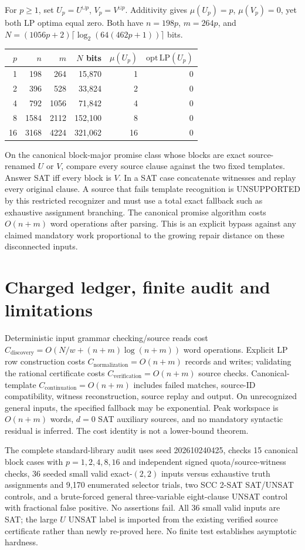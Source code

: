 \documentclass[11pt]{article}
\begin{document}
For $p\ge1$, set $U_p=U^{\sqcup p}$, $V_p=V^{\sqcup p}$. Additivity gives $\mu(U_p)=p$, $\mu(V_p)=0$, yet both LP optima equal zero. Both have $n=198p$, $m=264p$, and $N=(1056p+2)\lceil\log_2(64(462p+1))\rceil$ bits.
\begin{center}\begin{tabular}{rrrrrr}\toprule
$p$&$n$&$m$&$N$ bits&$\mu(U_p)$&$\mathrm{opt\,LP}(U_p)$\\\midrule
1&198&264&15,870&1&0\\
2&396&528&33,824&2&0\\
4&792&1056&71,842&4&0\\
8&1584&2112&152,100&8&0\\
16&3168&4224&321,062&16&0\\\bottomrule\end{tabular}\end{center}
On the canonical block-major promise class whose blocks are exact source-renamed $U$ or $V$, compare every source clause against the two fixed templates. Answer SAT iff every block is $V$. In a SAT case concatenate witnesses and replay every original clause. A source that fails template recognition is UNSUPPORTED by this restricted recognizer and must use a total exact fallback such as exhaustive assignment branching. The canonical promise algorithm costs $O(n+m)$ word operations after parsing. This is an explicit bypass against any claimed mandatory work proportional to the growing repair distance on these disconnected inputs.

\section{Charged ledger, finite audit and limitations}
Deterministic input grammar checking/source reads cost $C_{\mathrm{discovery}}=O(N/w+(n+m)\log(n+m))$ word operations. Explicit LP row construction costs $C_{\mathrm{normalization}}=O(n+m)$ records and writes; validating the rational certificate costs $C_{\mathrm{verification}}=O(n+m)$ source checks. Canonical-template $C_{\mathrm{continuation}}=O(n+m)$ includes failed matches, source-ID compatibility, witness reconstruction, source replay and output. On unrecognized general inputs, the specified fallback may be exponential. Peak workspace is $O(n+m)$ words, $d=0$ SAT auxiliary sources, and no mandatory syntactic residual is inferred. The cost identity is not a lower-bound theorem.

The complete standard-library audit uses seed 202610240425, checks 15 canonical block cases with $p=1,2,4,8,16$ and independent signed quota/source-witness checks, 36 seeded small valid exact-$(2,2)$ inputs versus exhaustive truth assignments and 9,170 enumerated selector trials, two SCC 2-SAT SAT/UNSAT controls, and a brute-forced general three-variable eight-clause UNSAT control with fractional false positive. No assertions fail. All 36 small valid inputs are SAT; the large $U$ UNSAT label is imported from the existing verified source certificate rather than newly re-proved here. No finite test establishes asymptotic hardness.
\end{document}
